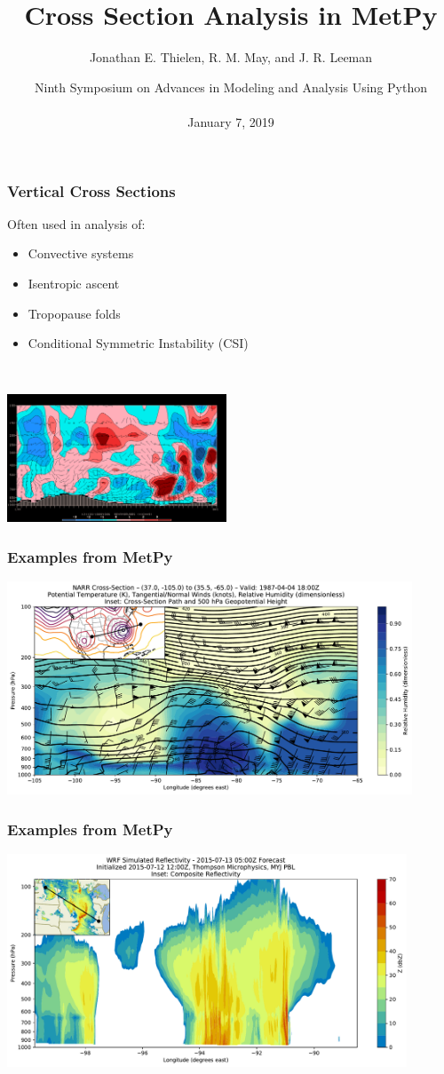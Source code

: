 \documentclass[aspectratio=169]{beamer}
\title[MetPy Cross Sections (288)]{Cross Section Analysis in MetPy}
\author[Thielen et al.]{Jonathan E. Thielen, R. M. May, and J. R. Leeman}
\date[January 7, 2019]{Ninth Symposium on Advances in Modeling and Analysis Using Python\\ \ \\January 7, 2019}
\begin{document}
\frame{\titlepage}

\begin{frame}
	\frametitle{Vertical Cross Sections}
    Often used in analysis of:
    \begin{itemize}
      \item Convective systems
      \item Isentropic ascent
      \item Tropopause folds
      \item Conditional Symmetric Instability (CSI)
    \end{itemize}
    
    \ 
    
    \begin{center}
        \includegraphics[height=1.5in]{figures/gempak_cross.png}
    \end{center}
\end{frame}

\begin{frame}
    \frametitle{Examples from MetPy}
    \begin{center}
        \includegraphics[height=2.5in]{figures/basic_example_narr.pdf}
    \end{center}
\end{frame}

\begin{frame}
    \frametitle{Examples from MetPy}
    \begin{center}
        \includegraphics[height=2.5in]{figures/wrf_refl.pdf}
    \end{center}
\end{frame}
\end{document}
